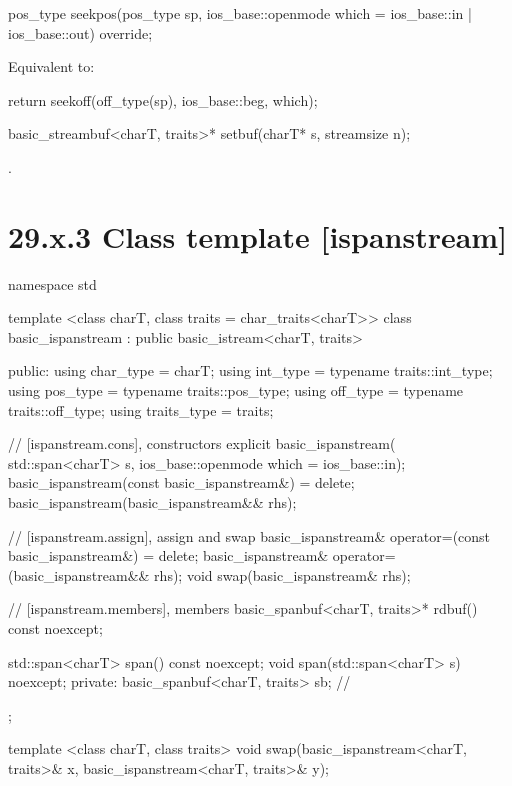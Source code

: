 \documentclass[ebook,11pt,article]{memoir}
\renewcommand{\iref}[1]{[#1]}
\begin{document}
\begin{itemdecl}
pos_type seekpos(pos_type sp,
                 ios_base::openmode which
                   = ios_base::in | ios_base::out) override;
\end{itemdecl}

\begin{itemdescr}
\pnum
\effects
Equivalent to: 
\begin{codeblock}
return seekoff(off_type(sp), ios_base::beg, which);
\end{codeblock}
\end{itemdescr}

\begin{itemdecl}
basic_streambuf<charT, traits>* setbuf(charT* s, streamsize n);
\end{itemdecl}

\begin{itemdescr}
\pnum
\effects
{}

\pnum
\returns
{}.
\end{itemdescr} 

\section{29.x.3 Class template  [ispanstream] }

\begin{codeblock}
namespace std {
  template <class charT, class traits = char_traits<charT>>
  class basic_ispanstream
    : public basic_istream<charT, traits> {
  public:
    using char_type      = charT;
    using int_type       = typename traits::int_type;
    using pos_type       = typename traits::pos_type;
    using off_type       = typename traits::off_type;
    using traits_type    = traits;

    // \iref{ispanstream.cons}, constructors
    explicit basic_ispanstream(
      std::span<charT> s,
      ios_base::openmode which = ios_base::in);
    basic_ispanstream(const basic_ispanstream&) = delete;
    basic_ispanstream(basic_ispanstream&& rhs);

    // \iref{ispanstream.assign}, assign and swap
    basic_ispanstream& operator=(const basic_ispanstream&) = delete;
    basic_ispanstream& operator=(basic_ispanstream&& rhs);
    void swap(basic_ispanstream& rhs);

    // \iref{ispanstream.members}, members
    basic_spanbuf<charT, traits>* rdbuf() const noexcept;

    std::span<charT> span() const noexcept;
    void span(std::span<charT> s) noexcept;
  private:
    basic_spanbuf<charT, traits> sb; // \expos
  };

  template <class charT, class traits>
    void swap(basic_ispanstream<charT, traits>& x,
              basic_ispanstream<charT, traits>& y);
}
\end{codeblock}
\end{document}
